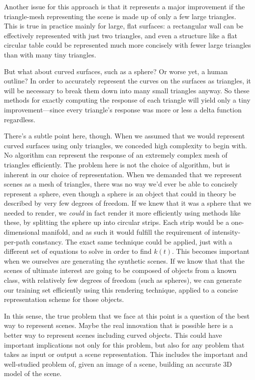 \documentclass[11pt]{article}
\begin{document}
Another issue for this approach is that it represents a major improvement if the triangle-mesh representing the scene is made up of only a few large triangles. This is true in practice mainly for large, flat surfaces: a rectangular wall can be effectively represented with just two triangles, and even a structure like a flat circular table could be represented much more concisely with fewer large triangles than with many tiny triangles. 

But what about curved surfaces, such as a sphere? Or worse yet, a human outline? In order to accurately represent the curves on the surfaces as triangles, it will be necessary to break them down into many small triangles anyway. So these methods for exactly computing the response of each triangle will yield only a tiny improvement---since every triangle's response was more or less a delta function regardless.

There's a subtle point here, though. When we assumed that we would represent curved surfaces using only triangles, we conceded high complexity to begin with. No algorithm can represent the response of an extremely complex mesh of triangles efficiently. The problem here is not the choice of algorithm, but is inherent in our choice of representation. When we demanded that we represent scenes as a mesh of triangles, there was no way we'd ever be able to concisely represent a sphere, even though a sphere is an object that could in theory be described by very few degrees of freedom. If we knew that it was a sphere that we needed to render, we \emph{could} in fact render it more efficiently using methods like these, by splitting the sphere up into circular strips. Each strip would be a one-dimensional manifold, and as such it would fulfill the requirement of intensity-per-path constancy. The exact same technique could be applied, just with a different set of equations to solve in order to find $k(t)$. This becomes important when we ourselves are generating the synthetic scenes. If we know that that the scenes of ultimate interest are going to be composed of objects from a known class, with relatively few degrees of freedom (such as spheres), we can generate our training set efficiently using this rendering technique, applied to a concise representation scheme for those objects.

In this sense, the true problem that we face at this point is a question of the best way to represent scenes. Maybe the real innovation that is possible here is a better way to represent scenes including curved objects. This could have important implications not only for this problem, but also for any problem that takes as input or output a scene representation. This includes the important and well-studied problem of, given an image of a scene, building an accurate 3D model of the scene.
\end{document}
